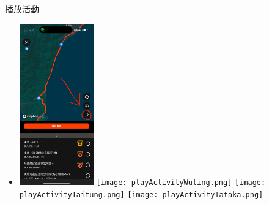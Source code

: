 \begin{frame}{播放活動}
\begin{itemize}
\item \includegraphics[width=3.2cm]{playActivity.png}\pause
\texttt{[image: playActivityWuling.png]}\pause
\texttt{[image: playActivityTaitung.png]}\pause
\texttt{[image: playActivityTataka.png]}
\end{itemize}
\end{frame}
